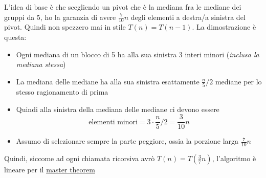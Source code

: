 L'idea di base è che scegliendo un pivot che è la mediana fra le mediane dei gruppi da 5, ho la garanzia di avere $ \frac{7}{10}n $ degli elementi a destra/a sinistra del pivot. Quindi non spezzero mai in stile $ T\left(n\right) = T\left(n-1\right) $. La dimostrazione è questa:
\begin{itemize}
	\item Ogni mediana di un blocco di 5 ha alla sua sinistra 3 interi minori (\textit{inclusa la mediana stessa})
	\item La mediana delle mediane ha alla sua sinistra esattamente $  \frac{n}{5} / 2 $ mediane per lo stesso ragionamento di prima
	\item Quindi alla sinistra della mediana delle mediane ci devono essere
	      \[
		      \text{elementi minori} = 3 \cdot \frac{n}{5} / {2} = \frac{3}{10}n
	      \]
	\item Assumo di selezionare sempre la parte peggiore, ossia la porzione larga $ \frac{7}{10}n $
\end{itemize}
Quindi, siccome ad ogni chiamata ricorsiva avrò $ T\left(n\right) = T\left(\frac{3}{7}n\right) $, l'algoritmo è lineare per il \hyperref[master theorem]{master theorem}

\vskip3mm

